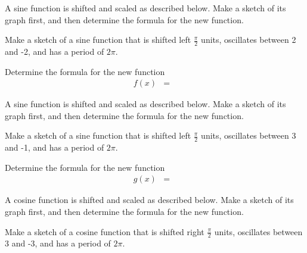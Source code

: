 \begin{problem}
\item A sine function is shifted and scaled as described
  below. Make a sketch of its graph first, and then determine the
  formula for the new function.
  \begin{subproblem}
  \item Make a sketch of a sine function that is shifted left
    $\frac{\pi}{2}$ units, oscillates between 2 and -2, and has a
    period of $2\pi$.

    \vspace{-0.5em}
    \hspace{-7em}\scalebox{0.72}{}

    \item Determine the formula for the new function
      \begin{eqnarray*}
        f(x) & = &
      \end{eqnarray*}
  \end{subproblem}

\item A sine function is shifted and scaled as described
  below. Make a sketch of its graph first, and then determine the
  formula for the new function.
  \begin{subproblem}
  \item Make a sketch of a sine function that is shifted left
    $\frac{\pi}{2}$ units, oscillates between 3 and -1, and has a
    period of $2\pi$.

    \vspace{-0.5em}
    \hspace{-7em}\scalebox{0.72}{}

    \item Determine the formula for the new function
      \begin{eqnarray*}
        g(x) & = &
      \end{eqnarray*}
  \end{subproblem}

\clearpage

\item A cosine function is shifted and scaled as described
  below. Make a sketch of its graph first, and then determine the
  formula for the new function.
  \begin{subproblem}
  \item Make a sketch of a cosine function that is shifted right
    $\frac{\pi}{2}$ units, oscillates between 3 and -3, and has a
    period of $2\pi$.


\end{subproblem}
\end{problem}

